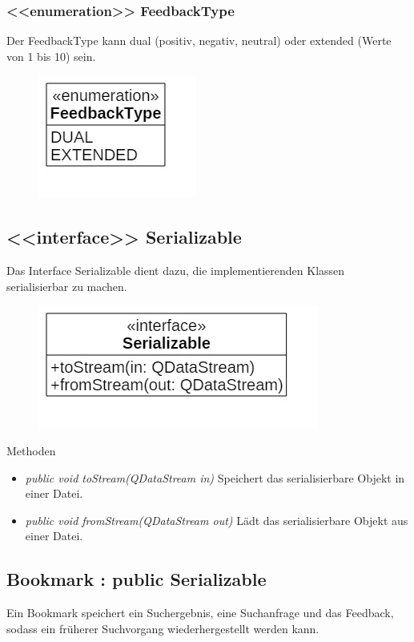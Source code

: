 \subsubsection*{<<enumeration>> FeedbackType}
Der FeedbackType kann dual (positiv, negativ, neutral) oder extended (Werte von 1 bis 10) sein.

\begin{figure}[H]
\centering
\includegraphics[scale=0.5]{img/Klassendiagramm/Klassen/Model/FeedbackType}
\label{fig:feedbackType}
\end{figure}

\subsection*{<<interface>> Serializable}
Das Interface Serializable dient dazu, die implementierenden Klassen serialisierbar zu machen.

\begin{figure}[H]
\centering
\includegraphics[scale=0.5]{img/Klassendiagramm/Klassen/Model/Serializable}
\label{fig:serializable}
\end{figure}

Methoden
\begin{itemize}
\item \textit{public void toStream(QDataStream in)} Speichert das serialisierbare Objekt in einer Datei.
\item \textit{public void fromStream(QDataStream out)} Lädt das serialisierbare Objekt aus einer Datei.
\end{itemize}

\subsection*{Bookmark : public Serializable}
Ein Bookmark speichert ein Suchergebnis, eine Suchanfrage und das Feedback, sodass ein früherer Suchvorgang wiederhergestellt werden kann.

